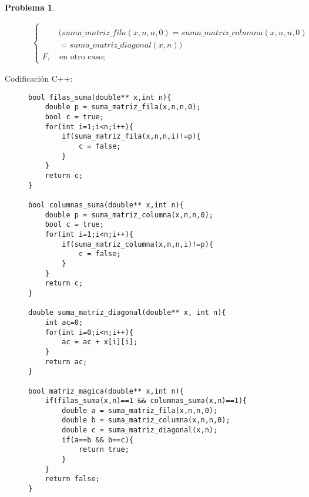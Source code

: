 \documentclass{article}
\theoremstyle{plain}
\theoremstyle{definition}
\newtheorem{problem}{Problema}
\begin{document}
\begin{problem}
\begin{description}
\begin{align*}
\begin{cases}
\\
\quad\quad (suma\_matriz\_fila(x,n,n,0) = suma\_matriz\_columna(x,n,n,0)\\ \quad\quad =  suma\_matriz\_diagonal(x,n))\\
F,\quad \text{en otro caso;}
\end{cases}
\end{align*}
%
\item[Codificación \textsf{C++}:]\hfill
%
\begin{verbatim}
bool filas_suma(double** x,int n){
    double p = suma_matriz_fila(x,n,n,0);
    bool c = true;
    for(int i=1;i<n;i++){
        if(suma_matriz_fila(x,n,n,i)!=p){
            c = false;
        }
    }
    return c;
}

bool columnas_suma(double** x,int n){
    double p = suma_matriz_columna(x,n,n,0);
    bool c = true;
    for(int i=1;i<n;i++){
        if(suma_matriz_columna(x,n,n,i)!=p){
            c = false;
        }
    }
    return c;
}

double suma_matriz_diagonal(double** x, int n){
    int ac=0;
    for(int i=0;i<n;i++){
        ac = ac + x[i][i];
    }
    return ac;
}

bool matriz_magica(double** x,int n){
    if(filas_suma(x,n)==1 && columnas_suma(x,n)==1){
        double a = suma_matriz_fila(x,n,n,0);
        double b = suma_matriz_columna(x,n,n,0);
        double c = suma_matriz_diagonal(x,n);
        if(a==b && b==c){
            return true;
        }
    }
    return false;
}
\end{verbatim}
\end{description}
\end{problem}
\end{document}
